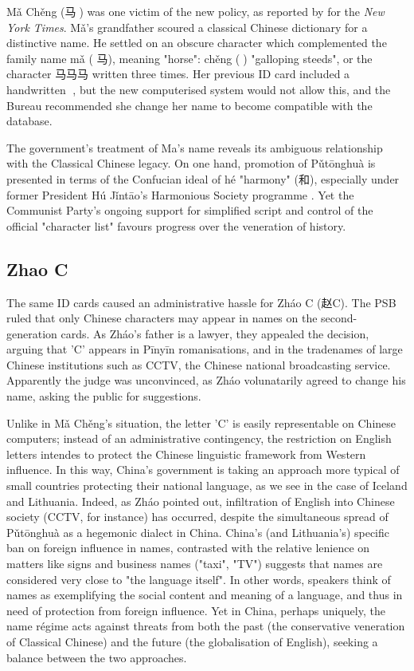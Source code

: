 Mǎ Chěng ({\zafont 马}{\zbfont 𩧢}) was one victim of the new policy, as
reported by \textcite{lafraniere09} for the \textit{New York Times}. Mǎ's
grandfather scoured a classical Chinese dictionary for a distinctive name. He
settled on an obscure character which complemented the family name mǎ ({\zafont
马}), meaning "horse": chěng ({\zbfont 𩧢}) "galloping steeds", or the character
{\zafont 马马马} written three times. Her previous ID card included a handwritten
{\zbfont 𩧢}, but the new computerised system would not allow this, and the
Bureau recommended she change her name to become compatible with the database.

The government's treatment of Ma's name reveals its ambiguous
relationship with the Classical Chinese legacy. On one hand, promotion of
Pǔtōnghuà is presented in terms of the Confucian ideal of hé "harmony" ({\zafont 和}),
especially under former President Hú Jǐntāo's Harmonious Society programme
\parencite{wang16}. Yet the Communist Party's ongoing support for simplified
script and control of the official "character list" favours progress over the
veneration of history.

\subsection{Zhao C}

The same ID cards caused an administrative hassle for Zháo C ({\zafont 赵}C). The
PSB ruled that only Chinese characters may appear in names on the
second-generation cards. As Zháo's father is a lawyer, they appealed the
decision, arguing that 'C' appears in Pīnyīn romanisations, and in the
tradenames of large Chinese institutions such as CCTV, the Chinese national
broadcasting service. Apparently the judge was unconvinced, as Zháo volunatarily
agreed to change his name, asking the public for suggestions.

Unlike in Mǎ Chěng's situation, the letter 'C' is easily representable on
Chinese computers; instead of an administrative contingency, the restriction on
English letters intendes to protect the Chinese linguistic framework from
Western influence. In this way, China's government is taking an approach more
typical of small countries protecting their national language, as we see in the
case of Iceland and Lithuania. Indeed, as Zháo pointed out, infiltration of
English into Chinese society (CCTV, for instance) has occurred, despite the
simultaneous spread of Pǔtōnghuà as a hegemonic dialect in China. China's (and
Lithuania's) specific ban on foreign influence in names, contrasted with the
relative lenience on matters like signs and business names ("taxi", "TV")
suggests that names are considered very close to "the language itself". In other
words, speakers think of names as exemplifying the social content and meaning of
a language, and thus in need of protection from foreign influence. Yet in China,
perhaps uniquely, the name régime acts against threats from both the past (the
conservative veneration of Classical Chinese) and the future (the globalisation
of English), seeking a balance between the two approaches.



